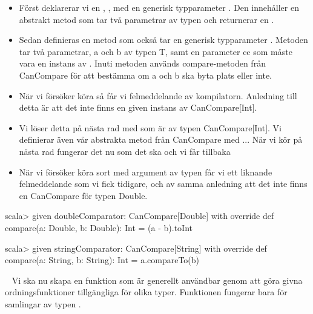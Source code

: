 \begin{itemize}
  \item Först deklarerar vi en , , med en generisk typparameter . Den innehåller en abstrakt metod  som tar två parametrar av typen  och returnerar en .
  \item Sedan definieras en metod  som också tar en generisk typparameter . Metoden tar två parametrar, a och b av typen T, samt en  parameter cc som måste vara en instans av . Inuti metoden används compare-metoden från CanCompare för att bestämma om a och b ska byta plats eller inte. 
  \item När vi försöker köra  så får vi felmeddelande av kompilatorn. Anledning till detta är att det inte finns en given instans av CanCompare[Int].
  \item Vi löser detta på nästa rad med  som är av typen \linebreak CanCompare[Int]. Vi definierar även vår abstrakta metod  från CanCompare med ... När vi kör  på nästa rad fungerar det nu som det ska och vi får tillbaka 
  \item När vi försöker köra sort med argument av typen  får vi ett liknande felmeddelande som vi fick tidigare, och av samma anledning att det inte finns en CanCompare för typen Double.
\end{itemize}

\SubtaskSolved 
\begin{REPL}
scala> given doubleComparator: CanCompare[Double] with
         override def compare(a: Double, b: Double): Int = (a - b).toInt
\end{REPL}

\SubtaskSolved 
\begin{REPL}
scala> given stringComparator: CanCompare[String] with
         override def compare(a: String, b: String): Int = a.compareTo(b)
\end{REPL}

\QUESTEND






\QUESTBEGIN

\Task \label{task:implicit-ordering} \what~  Vi ska nu skapa en funktion  som är generellt användbar genom att göra givna ordningsfunktioner tillgängliga för olika typer. Funktionen   fungerar bara för samlingar av typen .

